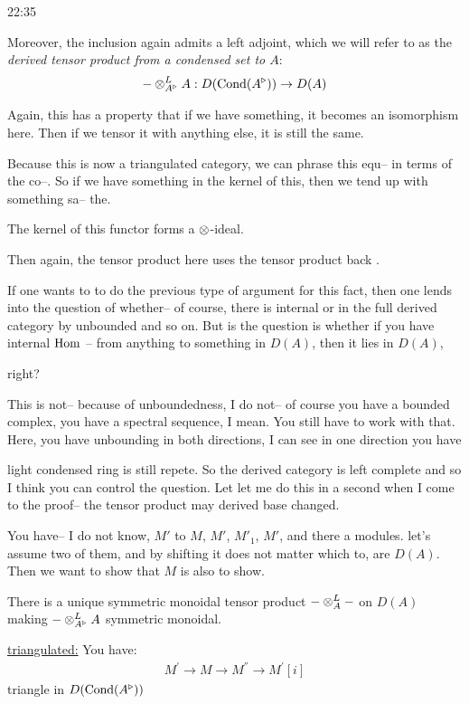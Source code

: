 \begin{unfinished}{22:35}

Moreover, the inclusion again admits a left adjoint, which we will refer to as the \emph{derived tensor product from a condensed set to $A$}:
\begin{align*}
- \otimes_{A^\triangleright}^L A: D(\mathrm{Cond}(A^\triangleright)) \to D(A)
\end{align*}

Again, this has a property that if we have something, it becomes an isomorphism here. Then if we tensor it with anything else, it is still the same.

Because this is now a triangulated category, we can phrase this equ-- in terms of the co--. So if we have something in the kernel of this, then we tend up with something sa-- the.

The kernel of this functor forms a $\otimes$-ideal.

Then again, the tensor product here uses the tensor product back .
\ep

\gabber If one wants to to do the previous type of argument for this fact, then one lends into the question of whether-- of course, there is internal or in the full derived category by unbounded and so on. But is the question is whether if you have internal $\operatorname{Hom}$ -- from anything to something in $D(A)$, then it lies in $D(A)$, 

\scholze right? 

\gabber This is not-- because of unboundedness, I do not-- of course you have a bounded complex, you have a spectral sequence, I mean. You still have to work with that. Here, you have unbounding in both directions, I can see in one direction you have 

\scholze {} light condensed ring is still repete. So the derived category is left complete and so I think you can control the question. Let let me do this in a second when I come to the proof-- the tensor product may derived base changed.

You have-- I do not know, $M'$ to $M$, $M'$, $M'_1$, $M'$, and there a modules. let's assume two of them, and by shifting it does not matter which to, are $D(A)$. Then we want to show that $M$ is also to show. 


There is a unique symmetric monoidal tensor product $ - \otimes^L_A -$ on $D(A)$ making $ - \otimes^L_{A^\triangleright} A$ symmetric monoidal.

\begin{sketch}
\underline{triangulated:}
You have:
\begin{align*}
M^{'} \to M \to M^{''} \to M^{'}[i]
\end{align*}
triangle in $D(\mathrm{Cond}(A^\triangleright))$


\end{sketch}
\end{unfinished}
